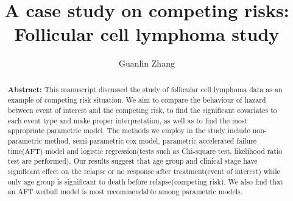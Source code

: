 \documentclass[times, doublespace]{simauth}
\begin{document}

\title{A case study on competing risks: Follicular cell lymphoma study}
\author{Guanlin Zhang\corrauth}

\address{Department of Biostatistics, University of Kansas Medical Center, 3901 Rainbow Boulevard, Kansas City, KS 66103}


\begin{abstract}
{\bf {Abstract:}} This manuscript discussed the study of follicular cell lymphoma data as an example of competing risk situation. We aim to compare the behaviour of hazard between event of interest and the competing risk, to find the significant covariates to each event type and make proper interpretation, as well as to find the most appropriate parametric model. The methods we employ in the study include non-parametric method, semi-parametric cox model, parametric accelerated failure time(AFT) model and logistic regression(tests such as Chi-square test, likelihood ratio test are performed). Our results suggest that age group and clinical stage have significant effect on the relapse or no response after treatment(event of interest) while only age group is significant to death before relapse(competing risk). We also find that an AFT weibull model is most recommendable among parametric models. 
\end{abstract}


\maketitle

\end{document}
